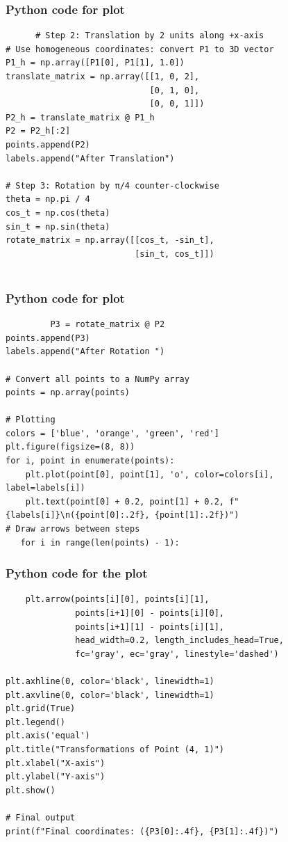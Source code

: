 \documentclass{beamer}
\begin{document}
 \begin{frame}[fragile]
       \frametitle{Python code for plot}
       \begin{lstlisting}
      # Step 2: Translation by 2 units along +x-axis
# Use homogeneous coordinates: convert P1 to 3D vector
P1_h = np.array([P1[0], P1[1], 1.0])
translate_matrix = np.array([[1, 0, 2],
                             [0, 1, 0],
                             [0, 0, 1]])
P2_h = translate_matrix @ P1_h
P2 = P2_h[:2]
points.append(P2)
labels.append("After Translation")

# Step 3: Rotation by π/4 counter-clockwise
theta = np.pi / 4
cos_t = np.cos(theta)
sin_t = np.sin(theta)
rotate_matrix = np.array([[cos_t, -sin_t],
                          [sin_t, cos_t]])


    \end{lstlisting}
 \end{frame}
 \begin{frame}[fragile]
   \frametitle{Python code for plot}
     \begin{lstlisting}
         P3 = rotate_matrix @ P2
points.append(P3)
labels.append("After Rotation ")

# Convert all points to a NumPy array
points = np.array(points)

# Plotting
colors = ['blue', 'orange', 'green', 'red']
plt.figure(figsize=(8, 8))
for i, point in enumerate(points):
    plt.plot(point[0], point[1], 'o', color=colors[i], label=labels[i])
    plt.text(point[0] + 0.2, point[1] + 0.2, f"{labels[i]}\n({point[0]:.2f}, {point[1]:.2f})")
# Draw arrows between steps
   for i in range(len(points) - 1):
     \end{lstlisting}
 \end{frame}
 \begin{frame}[fragile]
    \frametitle{Python code for the plot}
     \begin{lstlisting} 
    plt.arrow(points[i][0], points[i][1],
              points[i+1][0] - points[i][0],
              points[i+1][1] - points[i][1],
              head_width=0.2, length_includes_head=True,
              fc='gray', ec='gray', linestyle='dashed')

plt.axhline(0, color='black', linewidth=1)
plt.axvline(0, color='black', linewidth=1)
plt.grid(True)
plt.legend()
plt.axis('equal')
plt.title("Transformations of Point (4, 1)")
plt.xlabel("X-axis")
plt.ylabel("Y-axis")
plt.show()

# Final output
print(f"Final coordinates: ({P3[0]:.4f}, {P3[1]:.4f})")
     \end{lstlisting}
 \end{frame}
\end{document}
